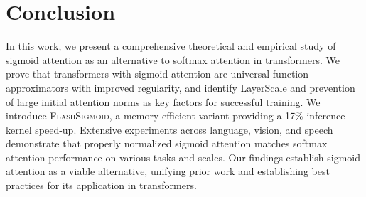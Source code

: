 \section{Conclusion}
\label{sec:conclusion}

In this work, we present a comprehensive theoretical and empirical study of sigmoid attention as an alternative to softmax attention in transformers. We prove that transformers with sigmoid attention are universal function approximators with improved regularity, and identify LayerScale and prevention of large initial attention norms as key factors for successful training. We introduce \textsc{FlashSigmoid}, a memory-efficient variant providing a 17\% inference kernel speed-up. Extensive experiments across language, vision, and speech demonstrate that properly normalized sigmoid attention matches softmax attention performance on various tasks and scales. Our findings establish sigmoid attention as a viable alternative, unifying prior work and establishing best practices for its application in transformers. 


